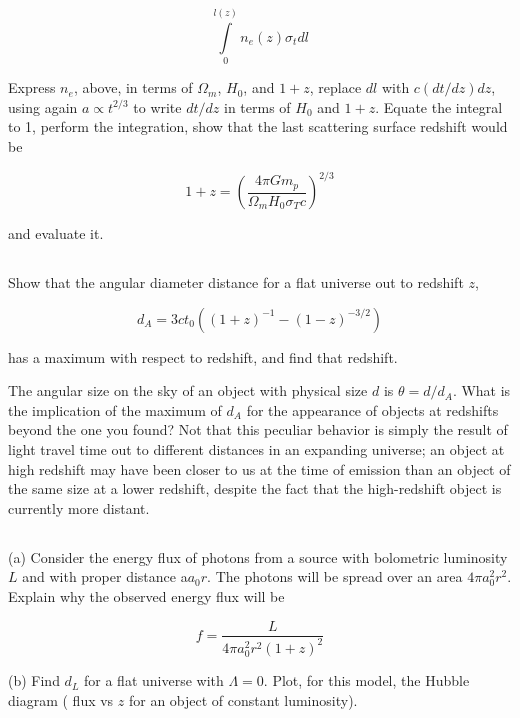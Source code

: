 \documentclass[12pt]{article}
\begin{document}
\[ \int\limits_0^{l(z)} n_e(z)\sigma_t dl
\]

Express \(n_e\), above, in terms of \(\Omega_m\), \(H_0\), and \(1+z\), replace \(dl\) with \( c(dt/dz)dz \), using again \(a \propto t^{2/3}\) to write \(dt/dz\) in terms of \(H_0\) and \(1+z\). Equate the integral to 1, perform the integration, show that the last scattering surface redshift would be

\[1+z = \left( \frac{4\pi G m_p}{\Omega_m H_0 \sigma_T c}\right)^{2/3}
\]

and evaluate it.

\subsection{} %

Show that the angular diameter distance for a flat universe out to redshift \(z\),

\[ d_A = 3ct_0\left( (1+z)^{-1} - (1-z)^{-3/2} \right)
\]

has a maximum with respect to redshift, and find that redshift.

The angular size on the sky of an object with physical size \(d\) is \(\theta=d/d_A\). What is the implication of the maximum of \(d_A\) for the appearance of objects at redshifts beyond the one you found? Not that this peculiar behavior is simply the result of light travel time out to different distances in an expanding universe; an object at high redshift may have been closer to us at the time of emission than an object of the same size at a lower redshift, despite the fact that the high-redshift object is currently more distant.


\subsection{} %

(a) Consider the energy flux of photons from a source with bolometric luminosity \(L\) and with proper distance a\(a_0r\). The photons will be spread over an area \(4\pi a_0^2r^2\). Explain why the observed energy flux will be

\[ f = \frac{L}{4\pi a_0^2r^2(1+z)^2}
\]

(b) Find \(d_L\) for a flat universe with \(\Lambda=0\). Plot, for this model, the Hubble diagram ( flux vs \(z\) for an object of constant luminosity).

\subsection{} %
\end{document}
